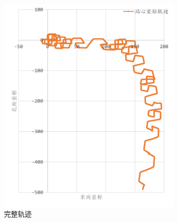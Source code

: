 \documentclass[10pt,a4paper]{ctexart}
\begin{document}
\begin{figure}[H]
    \centering
    {
        \begin{subfigure}{0.49\textwidth}
            \centering
            \includegraphics[width=\linewidth]{Figures/DataFigure/灵素修正站心坐标轨迹.png}
            \caption{完整轨迹}
        \end{subfigure}\hfill
        \begin{subfigure}{0.49\textwidth}
            \centering

\end{subfigure}}
\end{figure}
\end{document}
